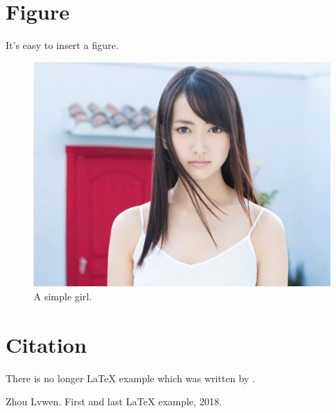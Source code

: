 \documentclass{article}
\begin{document}
\section{Figure}
It's easy to insert a figure. 
\begin{figure}
  \centering
  \includegraphics[scale=0.2]{Risa.jpg}
  \caption{A simple girl.}
  \label{fig:birds}
\end{figure}

\section{Citation}\label{conclusions}
There is no longer \LaTeX{} example which was written by \cite{zhou2018latex}.

\begin{thebibliography}{9}
 Zhou Lvwen. First and last \LaTeX{} example, 2018.
\end{thebibliography}
\end{document}
